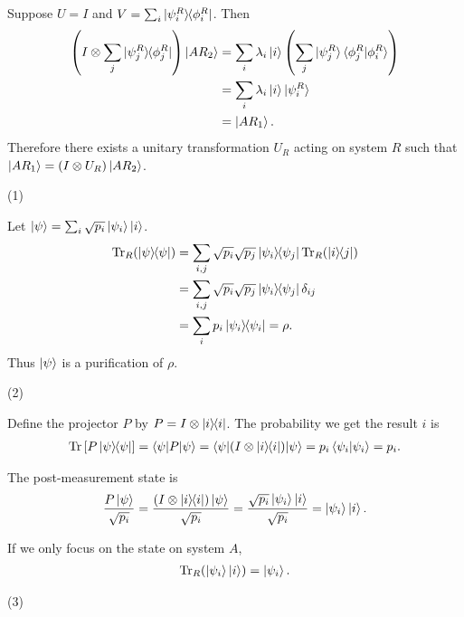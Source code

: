 Suppose $U = I$ and $V = \sum_i \ket{\psi_i^R}\hspace{-1mm} \bra{\phi_i^R}$.
Then
\begin{align*}
    \left(I \otimes \sum_j \ket{\psi_j^R}\hspace{-1mm} \bra{\phi_j^R} \right) \ket{AR_2} &= \sum_i \lambda_i \ket{i} \left( \sum_j \ket{\psi_j^R} \braket{\phi_j^R | \phi_i^R} \right)\\
                                                           &= \sum_i \lambda_i \ket{i} \ket{\psi_i^R}\\
                                                           &= \ket{AR_1}.
\end{align*}
%
Therefore there exists a unitary transformation $U_R$ acting on system $R$ such that $\ket{AR_1} = (I \otimes U_R) \ket{AR_2}$.



(1)

Let $\ket{\psi} = \sum_i \sqrt{p_i} \ket{\psi_i} \ket{i}$.
\begin{align*}
    \operatorname{Tr}_R (\ket{\psi}\hspace{-1mm} \bra{\psi})
        &= \sum_{i,j} \sqrt{p_i} \sqrt{p_j} \ket{\psi_i}\hspace{-1mm} \bra{\psi_j} \operatorname{Tr}_R (\ket{i}\hspace{-1mm} \bra{j})\\
        &= \sum_{i,j} \sqrt{p_i} \sqrt{p_j} \ket{\psi_i}\hspace{-1mm} \bra{\psi_j} \delta_{ij}\\
        &= \sum_i p_i \ket{\psi_i}\hspace{-1mm} \bra{\psi_i} = \rho.
\end{align*}
Thus $\ket{\psi}$ is a purification of $\rho$.

\vspace{5mm}
(2)

Define the projector $P$ by $P = I \otimes \ket{i}\hspace{-1mm} \bra{i}$.
The probability we get the result $i$ is
\begin{align*}
    \operatorname{Tr} \left[ P \ket{\psi}\hspace{-1mm} \bra{\psi}\right] = \braket{\psi | P | \psi} = \braket{\psi | (I \otimes \ket{i}\hspace{-1mm} \bra{i}) | \psi} = p_i \braket{\psi_i | \psi_i} = p_i.
\end{align*}

The post-measurement state is
\begin{align*}
    \frac{P \ket{\psi}}{\sqrt{p_i}}
    = \frac{(I \otimes \ket{i}\hspace{-1mm} \bra{i}) \ket{\psi}}{\sqrt{p_i}}
        = \frac{\sqrt{p_i} \ket{\psi_i}\ket{i}}{\sqrt{p_i}} = \ket{\psi_i}\ket{i}.
\end{align*}

If we only focus on the state on system $A$,
\begin{align*}
    \operatorname{Tr}_R (\ket{\psi_i} \ket{i}) = \ket{\psi_i}.
\end{align*}

\vspace{5mm}
(3)

